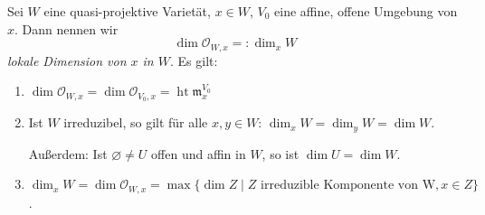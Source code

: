 \documentclass[a4paper,12pt,index=toc]{scrbook}
\theoremstyle{keinenummern} %
\def\O{\mathcal{O}}
\def\m{\mathfrak{m}}
\newcommand{\hoehe}{\operatorname{ht}}
\newcommand{\leer}{\ensuremath{\varnothing}}
\begin{document}
\begin{prop}\label{3.2.7} 
Sei $W$ eine quasi-projektive Varietät, $x\in W$, $V_0$ eine affine, offene Umgebung von $x$. Dann nennen wir 
\begin{equation*}\dim \O_{W,x}=:\dim_x W\end{equation*}
 \emph{lokale Dimension von $x$ in $W$}.
Es gilt:
  \begin{enumerate}
  \item{} $\dim \O_{W,x}=\dim \O_{V_0,x}=\hoehe\m_x^{V_0}$
  \item{} Ist $W$ irreduzibel, so gilt für alle $x,y \in W$: $\dim_x W=\dim_y W=\dim W$.

  Außerdem: Ist $\leer \neq U$ offen und affin in $W$, so ist $\dim U=\dim W$.
  \item{} $\dim_x W=\dim \O_{W,x}=\max\{\dim Z \mid Z \text{ irreduzible Komponente von W},x\in Z\}$.
  \end{enumerate}
\end{prop}
\end{document}
